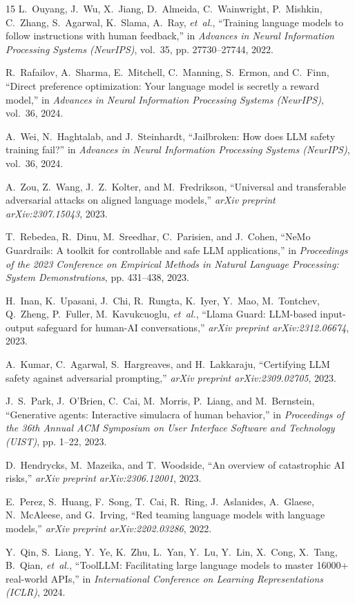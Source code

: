 \documentclass[conference]{IEEEtran}
\begin{document}
\begin{thebibliography}{15}
L.~Ouyang, J.~Wu, X.~Jiang, D.~Almeida, C.~Wainwright, P.~Mishkin, C.~Zhang, S.~Agarwal, K.~Slama, A.~Ray, \emph{et~al.}, ``Training language models to follow instructions with human feedback,'' in \emph{Advances in Neural Information Processing Systems (NeurIPS)}, vol.~35, pp. 27730--27744, 2022.

R.~Rafailov, A.~Sharma, E.~Mitchell, C.~Manning, S.~Ermon, and C.~Finn, ``Direct preference optimization: Your language model is secretly a reward model,'' in \emph{Advances in Neural Information Processing Systems (NeurIPS)}, vol.~36, 2024.

A.~Wei, N.~Haghtalab, and J.~Steinhardt, ``Jailbroken: How does LLM safety training fail?'' in \emph{Advances in Neural Information Processing Systems (NeurIPS)}, vol.~36, 2024.

A.~Zou, Z.~Wang, J.~Z.~Kolter, and M.~Fredrikson, ``Universal and transferable adversarial attacks on aligned language models,'' \emph{arXiv preprint arXiv:2307.15043}, 2023.

T.~Rebedea, R.~Dinu, M.~Sreedhar, C.~Parisien, and J.~Cohen, ``NeMo Guardrails: A toolkit for controllable and safe LLM applications,'' in \emph{Proceedings of the 2023 Conference on Empirical Methods in Natural Language Processing: System Demonstrations}, pp. 431--438, 2023.

H.~Inan, K.~Upasani, J.~Chi, R.~Rungta, K.~Iyer, Y.~Mao, M.~Tontchev, Q.~Zheng, P.~Fuller, M.~Kavukcuoglu, \emph{et~al.}, ``Llama Guard: LLM-based input-output safeguard for human-AI conversations,'' \emph{arXiv preprint arXiv:2312.06674}, 2023.

A.~Kumar, C.~Agarwal, S.~Hargreaves, and H.~Lakkaraju, ``Certifying LLM safety against adversarial prompting,'' \emph{arXiv preprint arXiv:2309.02705}, 2023.

J.~S.~Park, J.~O'Brien, C.~Cai, M.~Morris, P.~Liang, and M.~Bernstein, ``Generative agents: Interactive simulacra of human behavior,'' in \emph{Proceedings of the 36th Annual ACM Symposium on User Interface Software and Technology (UIST)}, pp. 1--22, 2023.

D.~Hendrycks, M.~Mazeika, and T.~Woodside, ``An overview of catastrophic AI risks,'' \emph{arXiv preprint arXiv:2306.12001}, 2023.

E.~Perez, S.~Huang, F.~Song, T.~Cai, R.~Ring, J.~Aslanides, A.~Glaese, N.~McAleese, and G.~Irving, ``Red teaming language models with language models,'' \emph{arXiv preprint arXiv:2202.03286}, 2022.

Y.~Qin, S.~Liang, Y.~Ye, K.~Zhu, L.~Yan, Y.~Lu, Y.~Lin, X.~Cong, X.~Tang, B.~Qian, \emph{et~al.}, ``ToolLLM: Facilitating large language models to master 16000+ real-world APIs,'' in \emph{International Conference on Learning Representations (ICLR)}, 2024.

\end{thebibliography}
\end{document}
